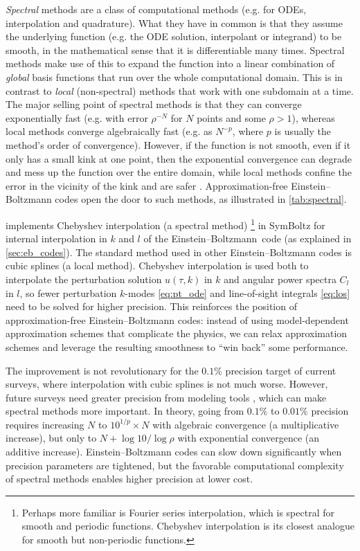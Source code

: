\documentclass[USenglish, thumbmarks]{uiophdthesis} %
\newcommand\EB{Einstein--Boltzmann}
\begin{document}
\emph{Spectral} methods are a class of computational methods (e.g. for ODEs, interpolation and quadrature).
What they have in common is that they assume the underlying function (e.g. the ODE solution, interpolant or integrand) to be smooth,
in the mathematical sense that it is differentiable many times.
Spectral methods make use of this to expand the function into a linear combination of \emph{global} basis functions that run over the whole computational domain.
This is in contrast to \emph{local} (non-spectral) methods that work with one subdomain at a time.
The major selling point of spectral methods is that they can converge exponentially fast (e.g. with error $\rho^{-N}$ for $N$ points and some $\rho>1$),
whereas local methods converge algebraically fast (e.g. as $N^{-p}$, where $p$ is usually the method's order of convergence).
However, if the function is not smooth, even if it only has a small kink at one point,
then the exponential convergence can degrade and mess up the function over the entire domain,
while local methods confine the error in the vicinity of the kink and are safer \cite{trefethenApproximationTheoryApproximation2019}.
Approximation-free \EB{} codes open the door to such methods,
as illustrated in \cref{tab:spectral}.

 implements Chebyshev interpolation (a spectral method)%
\footnote{Perhaps more familiar is Fourier series interpolation,
which is spectral for smooth and periodic functions.
Chebyshev interpolation is its closest analogue for smooth but non-periodic functions.}
in SymBoltz for internal interpolation in $k$ and $l$ of the \EB{} code (as explained in \cref{sec:eb_codes}).
The standard method used in other \EB{} codes is cubic splines (a local method).
Chebyshev interpolation is used both to interpolate the perturbation solution $u(\tau,k)$ in $k$ and angular power spectra $C_l$ in $l$,
so fewer perturbation $k$-modes \eqref{eq:pt_ode} and line-of-sight integrals \eqref{eq:los} need to be solved for higher precision.
This reinforces the position of approximation-free \EB{} codes:
instead of using model-dependent approximation schemes that complicate the physics,
we can relax approximation schemes and leverage the resulting smoothness
to \enquote{win back} some performance.

The improvement is not revolutionary for the $0.1\%$ precision target of current surveys,
where interpolation with cubic splines is not much worse.
However, future surveys need greater precision from modeling tools \cite[e.g.][]{mccarthyBaryonicFeedbackBiases2022,lewisCAMBV2Cosmological2026a},
which can make spectral methods more important.
In theory, going from $0.1\%$ to $0.01\%$ precision requires increasing $N$ to $10^{1/p} \times N$ with algebraic convergence (a multiplicative increase),
but only to $N + \log 10 / \log \rho$ with exponential convergence (an additive increase).
\EB{} codes can slow down significantly when precision parameters are tightened,
but the favorable computational complexity of spectral methods enables higher precision at lower cost.
\end{document}
